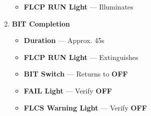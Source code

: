 \begin{checklistenumerate}
\begin{enumerate}
        \begin{itemize}
            \item \textbf{FLCP RUN Light} --- Illuminates
        \end{itemize}
        \item \textbf{BIT Completion}
        \begin{itemize}
            \item \textbf{Duration} --- Approx. 45s
            \item \textbf{FLCP RUN Light} --- Extinguishes
            \item \textbf{BIT Switch} --- Returns to \textbf{OFF}
            \item \textbf{FAIL Light} --- Verify \textbf{OFF}
            \item \textbf{FLCS Warning Light} --- Verify \textbf{OFF}
        \end{itemize}
    \end{enumerate}
\end{checklistenumerate}

\clearpage


